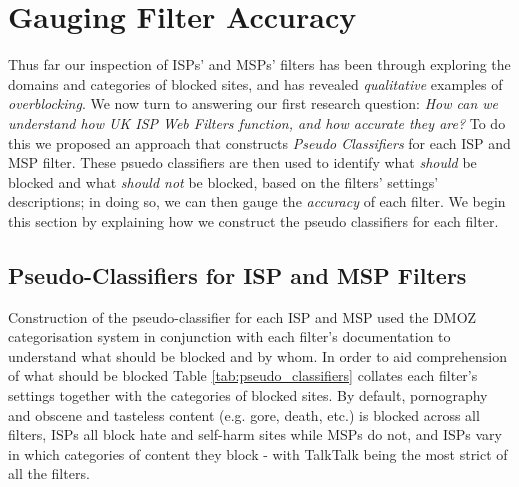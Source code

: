 \documentclass{bmcart}
\begin{document}
\clearpage
\section*{Gauging Filter Accuracy}
Thus far our inspection of ISPs' and MSPs' filters has been through exploring the domains and categories of blocked sites, and has revealed \textit{qualitative} examples of \textit{overblocking}.
We now turn to answering our first research question: \textit{How can we understand how UK ISP Web Filters function, and how accurate they are?}
To do this we proposed an approach that constructs \textit{Pseudo Classifiers} for each ISP and MSP filter.
These psuedo classifiers are then used to identify what \textit{should} be blocked and what \textit{should not} be blocked, based on the filters' settings' descriptions; in doing so, we can then gauge the \textit{accuracy} of each filter.
We begin this section by explaining how we construct the pseudo classifiers for each filter.

\subsection*{Pseudo-Classifiers for ISP and MSP Filters}
Construction of the pseudo-classifier for each ISP and MSP used the DMOZ categorisation system in conjunction with each filter's documentation to understand what should be blocked and by whom.
In order to aid comprehension of what should be blocked Table \ref{tab:pseudo_classifiers} collates each filter's settings together with the categories of blocked sites.
By default, pornography and obscene and tasteless content (e.g. gore, death, etc.) is blocked across all filters, ISPs all block hate and self-harm sites while MSPs do not, and ISPs vary in which categories of content they block - with TalkTalk being the most strict of all the filters.
\end{document}
